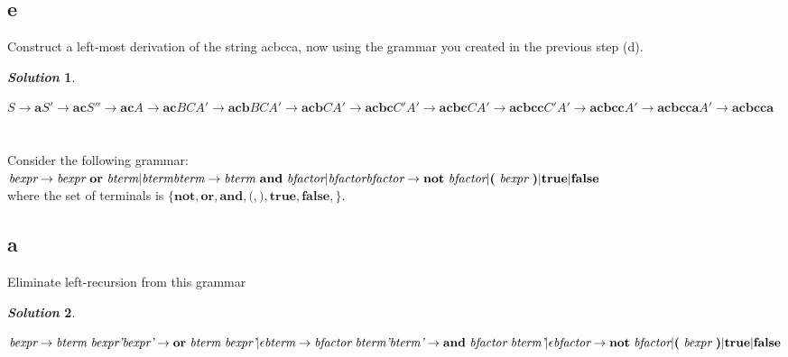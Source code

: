 \documentclass[11pt, a4paper]{article}
\newtheorem*{solution}{\emph{Solution}}
\begin{document}
	\subsection*{e}
		Construct a left-most derivation of the string acbcca, now using the grammar you created in the previous step (d).
		\begin{solution}\end{solution}
		$S \rightarrow \textbf{a}S' \rightarrow \textbf{ac}S'' \rightarrow \textbf{ac}A 
		      \rightarrow \textbf{ac}BCA' \rightarrow \textbf{acb}BCA' \rightarrow \textbf{acb}CA'
		      \rightarrow \textbf{acbc}C'A' \rightarrow \textbf{acbc}CA' \rightarrow \textbf{acbcc}C'A'
		      \rightarrow \textbf{acbcc}A' \rightarrow \textbf{acbcca}A' \rightarrow \textbf{acbcca}
		$

\section{}
	
	Consider the following grammar:\\
	$
		\textit{bexpr} \rightarrow \textit{bexpr}\ \textbf{or}\ \textit{bterm} | \textit{bterm}\\
		\textit{bterm} \rightarrow \textit{bterm}\ \textbf{and}\ \textit{bfactor} | \textit{bfactor}\\
		\textit{bfactor} \rightarrow \textbf{not}\ \textit{bfactor} | \textbf{(}\ \textit{bexpr}\ \textbf{)} | \textbf{true} | \textbf{false}
	$\\
	where the set of terminals is $\{\textbf{not}, \textbf{or}, \textbf{and}, \textbf{(}, \textbf{)}, \textbf{true}, \textbf{false}, \}$.

\subsection*{a}
	Eliminate left-recursion from this grammar
	\begin{solution}\end{solution}
	$
		\textit{bexpr} \rightarrow \textit{bterm}\ \textit{bexpr'}\\
		\textit{bexpr'} \rightarrow \textbf{or}\ \textit{bterm}\ \textit{bexpr'} | \epsilon\\
		\textit{bterm} \rightarrow \textit{bfactor}\ \textit{bterm'}\\
		\textit{bterm'} \rightarrow \textbf{and}\ \textit{bfactor}\ \textit{bterm'} | \epsilon\\
		\textit{bfactor} \rightarrow \textbf{not}\ \textit{bfactor} | \textbf{(}\ \textit{bexpr}\ \textbf{)} | \textbf{true} | \textbf{false}
	$
\end{document}

